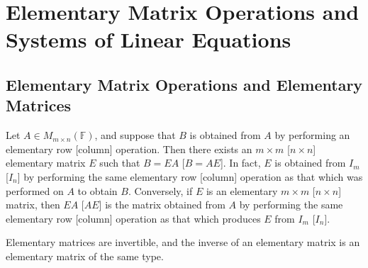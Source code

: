 \section{Elementary Matrix Operations and Systems of Linear Equations}
\subsection{Elementary Matrix Operations and Elementary Matrices}
\begin{theorem}
    Let \( A \in M_{m \times n}(\mathbb{F}) \), and suppose that \( B \) is obtained from \( A \) by performing an elementary row [column] operation. Then there exists an \( m \times m \) [\( n \times n \)] elementary matrix \( E \) such that \( B = EA \) [\( B = AE \)]. In fact, \( E \) is obtained from \( I_m \) [\( I_n \)] by performing the same elementary row [column] operation as that which was performed on \( A \) to obtain \( B \). Conversely, if \( E \) is an elementary \( m \times m \) [\( n \times n \)] matrix, then \( EA \) [\( AE \)] is the matrix obtained from \( A \) by performing the same elementary row [column] operation as that which produces \( E \) from \( I_m \) [\( I_n \)].
\end{theorem}

\begin{theorem}
    Elementary matrices are invertible, and the inverse of an elementary matrix is an elementary matrix of the same type.
\end{theorem}


